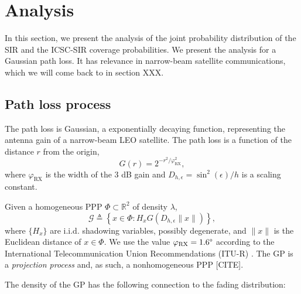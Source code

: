 \documentclass[lettersize,journal]{IEEEtran}
\newcommand{\R}{\mathbb{R}}
\begin{document}
\section{Analysis}
In this section, we present the analysis of the joint probability distribution of the SIR and the ICSC-SIR coverage probabilities. We present the analysis for a Gaussian path loss. It has relevance in narrow-beam satellite communications, which we will come back to in section XXX.
\subsection{Path loss process}
The path loss is Gaussian, a exponentially decaying function, representing the antenna gain of a narrow-beam LEO satellite. The path loss is a function of the distance $r$ from the origin, 
\begin{equation}
  G(r) = 2^{-r^2/\varphi^2_{\text{RX}}},
\end{equation}
where $\varphi_{\text{RX}}$ is the width of the $3$ dB gain and $D_{h,\epsilon}=\sin^2(\epsilon)/h$ is a scaling constant. 


Given a homogeneous PPP $\Phi \subset \R^2$ of density $\lambda$,
\begin{equation}
  \label{eq:gainprocess}
  \mathcal{G} \triangleq \left\{x \in \Phi : H_x G(D_{h,\epsilon}\|x\|) \right\},
\end{equation}
where $\{H_x\}$ are i.i.d. shadowing variables, possibly degenerate, and $\|x\|$ is the Euclidean distance of $x \in \Phi$. We use the value $\varphi_{\text{RX}} = 1.6 \degree$ according to the International Telecommunication Union Recommendations (ITU-R) \cite{ITURS1528}. The GP is a \textit{projection process} and, as such, a nonhomogeneous PPP [CITE].

The density of the GP has the following connection to the fading distribution:
\end{document}
